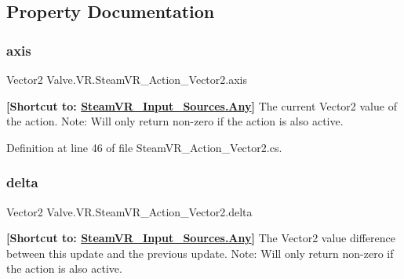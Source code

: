 \subsection{Property Documentation}
\mbox{\label{class_valve_1_1_v_r_1_1_steam_v_r___action___vector2_afd401d7d248459f2e074dc2b04f4bdc9}} 
\subsubsection{\texorpdfstring{axis}{axis}}
{\footnotesize\ttfamily Vector2 Valve.\+V\+R.\+Steam\+V\+R\+\_\+\+Action\+\_\+\+Vector2.\+axis\hspace{0.3cm}{\ttfamily [get]}}



{\bfseries{\mbox{[}Shortcut to\+: \mbox{\hyperlink{namespace_valve_1_1_v_r_a82e5bf501cc3aa155444ee3f0662853faed36a1ef76a59ee3f15180e0441188ad}{Steam\+V\+R\+\_\+\+Input\+\_\+\+Sources.\+Any}}\mbox{]}}} The current Vector2 value of the action. Note\+: Will only return non-\/zero if the action is also active. 



Definition at line 46 of file Steam\+V\+R\+\_\+\+Action\+\_\+\+Vector2.\+cs.

\mbox{\label{class_valve_1_1_v_r_1_1_steam_v_r___action___vector2_ad1de90619e8911feb3ad60732edefd51}} 
\subsubsection{\texorpdfstring{delta}{delta}}
{\footnotesize\ttfamily Vector2 Valve.\+V\+R.\+Steam\+V\+R\+\_\+\+Action\+\_\+\+Vector2.\+delta\hspace{0.3cm}{\ttfamily [get]}}



{\bfseries{\mbox{[}Shortcut to\+: \mbox{\hyperlink{namespace_valve_1_1_v_r_a82e5bf501cc3aa155444ee3f0662853faed36a1ef76a59ee3f15180e0441188ad}{Steam\+V\+R\+\_\+\+Input\+\_\+\+Sources.\+Any}}\mbox{]}}} The Vector2 value difference between this update and the previous update. Note\+: Will only return non-\/zero if the action is also active. 



